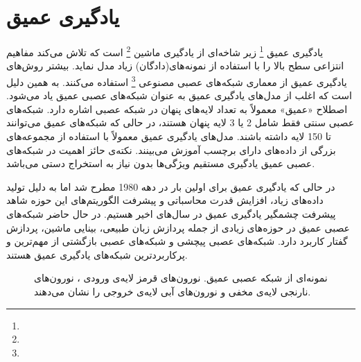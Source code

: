 \section{یادگیری عمیق}
	یادگیری عمیق
	\footnote{}
	زیر شاخه‌ای از یادگیری ماشین
	 \footnote{}
	  است که تلاش می‌کند مفاهیم انتزاعی سطح بالا را با استفاده از نمونه‌های(دادگان) زیاد مدل نماید. بیشتر روش‌های یادگیری عمیق از معماری شبکه‌های عصبی مصنوعی
	  \footnote{}
	  استفاده می‌کنند‌. به همین دلیل است که اغلب از مدل‌های یادگیری عمیق به عنوان شبکه‌های عصبی عمیق یاد می‌شود. اصطلاح «عمیق» معمولاً به تعداد لایه‌های پنهان در شبکه عصبی اشاره دارد. شبکه‌های عصبی سنتی فقط شامل 2 یا 3 لایه پنهان هستند، در حالی که شبکه‌های عمیق می‌توانند تا 150 لایه داشته باشند. مدل‌های یادگیری عمیق معمولاً با استفاده از مجموعه‌های بزرگی از داده‌های دارای برچسب آموزش می‌بینند. نکته‌ی حائز اهمیت در شبکه‌های عصبی عمیق یادگیری مستقیم ویژگی‌ها بدون نیاز به استخراج دستی می‌باشد.
	  
	  در حالی که یادگیری عمیق برای اولین بار در دهه 1980 مطرح شد اما به دلیل تولید داده‌های زیاد، افزایش  قدرت محاسباتی و پیشرفت الگوریتم‌های این حوزه شاهد پیشرفت چشمگیر یادگیری عمیق در سال‌های اخیر هستیم. در حال حاضر شبکه‌های عصبی عمیق در حوزه‌های زیادی از جمله پردازش زبان طبیعی، بینایی ماشین، پردازش گفتار کاربرد دارد. شبکه‌های عصبی پیچشی و شبکه‌های عصبی بازگشتی از مهم‌ترین و پرکاربردترین شبکه‌های یادگیری عمیق هستند.
	\begin{figure}
	  	\caption[نمونه‌ای از شبکه عصبی عمیق]{نمونه‌ای از شبکه عصبی عمیق. نورون‌های قرمز لایه‌ی ورودی ، نورون‌های نارنجی لایه‌ی مخفی و نورون‌های آبی لایه‌ی خروجی را نشان ‌می‌دهند.}
	  	\label{fig:DNN}
	\end{figure}

